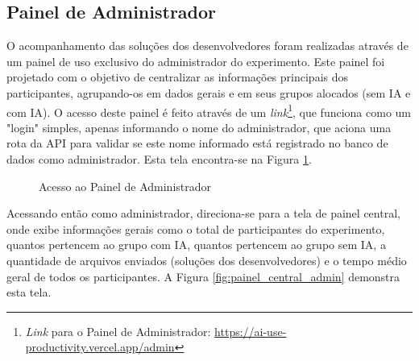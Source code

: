 \documentclass[english,brazilian]{UNISINOSartigo} %
\begin{document}
\subsection{Painel de Administrador}

O acompanhamento das soluções dos desenvolvedores foram realizadas através de um painel de uso exclusivo do administrador do experimento. Este painel foi projetado com o objetivo de centralizar as informações principais dos participantes, agrupando-os em dados gerais e em seus grupos alocados (sem IA e com IA). O acesso deste painel é feito através de um \textit{link}\footnote{\textit{Link} para o Painel de Administrador: \url{https://ai-use-productivity.vercel.app/admin}}, que funciona como um "login" simples, apenas informando o nome do administrador, que aciona uma rota da API para validar se este nome informado está registrado no banco de dados como administrador. Esta tela encontra-se na Figura \ref{fig:painel_admin}.

\begin{figure}[ht]
    \caption{Acesso ao Painel de Administrador}
    \label{fig:painel_admin}
    \centering
    \footnotesize
    \begin{minipage}{.9\textwidth}
        \centering
    \end{minipage}
\end{figure}
\FloatBarrier

Acessando então como administrador, direciona-se para a tela de painel central, onde exibe informações gerais como o total de participantes do experimento, quantos pertencem ao grupo com IA, quantos pertencem ao grupo sem IA, a quantidade de arquivos enviados (soluções dos desenvolvedores) e o tempo médio geral de todos os participantes. A Figura \ref{fig:painel_central_admin} demonstra esta tela.
\end{document}
